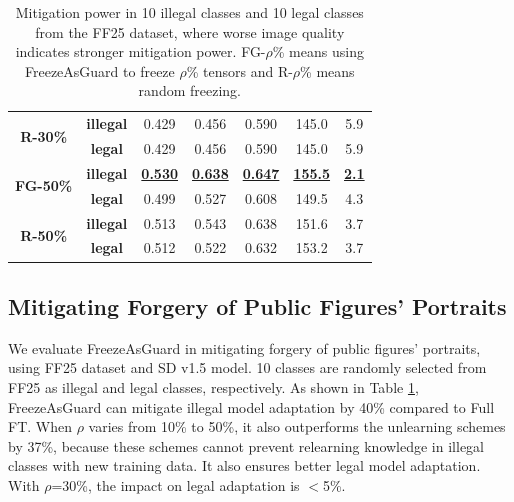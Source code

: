 \documentclass{article}
\begin{document}
\begin{table}
{\begin{tabular}{ccccccc}
			\multirow{2}{*}{\textbf{R-30\%}}
			&\textbf{illegal}&0.429& 0.456& 0.590& 145.0 &5.9 \\ \cmidrule(ll){2-7}
			&\textbf{legal}&0.429& 0.456&0.590&145.0 &5.9 \\  			\midrule[1pt]
			\multirow{2}{*}{\textbf{FG-50\%}}
			&\textbf{illegal}&\textbf{\underline{0.530}}&\textbf{\underline{0.638}}&\textbf{\underline{0.647}}&\textbf{\underline{155.5}}&\textbf{\underline{2.1}}  \\ \cmidrule(ll){2-7}
			&\textbf{legal}&0.499&0.527&0.608&149.5&4.3  \\  			\midrule[1pt]
			\multirow{2}{*}{\textbf{R-50\%}}
			&\textbf{illegal}&0.513& 0.543& 0.638& 151.6 &3.7 \\ \cmidrule(ll){2-7}
			&\textbf{legal}&0.512&0.522&0.632&153.2&3.7  \\  \bottomrule
	\end{tabular}}
	\vspace{0.1in}
	\caption{Mitigation power in 10 illegal classes and 10 legal classes from the FF25 dataset, where worse image quality indicates stronger mitigation power. FG-$\rho$\% means using FreezeAsGuard to freeze $\rho$\% tensors and R-$\rho$\% means random freezing. }
	\vspace{-0.1in}
	\label{tab:ff25_main}
\end{table}

\subsection{Mitigating Forgery of Public Figures' Portraits}
\label{subsec:result_portraits}
We evaluate FreezeAsGuard in mitigating forgery of public figures' portraits, using FF25 dataset and SD v1.5 model. 10 classes are randomly selected from FF25 as illegal and legal classes, respectively. As shown in Table \ref{tab:ff25_main}, FreezeAsGuard can mitigate illegal model adaptation 
by 40\% compared to Full FT. When $\rho$ varies from 10\% to 50\%, it also outperforms the unlearning schemes by 37\%, because these schemes cannot prevent relearning knowledge in illegal classes with new training data. It also ensures better legal model adaptation. With $\rho$=30\%, the impact on legal adaptation is $<$5\%.
\end{document}
